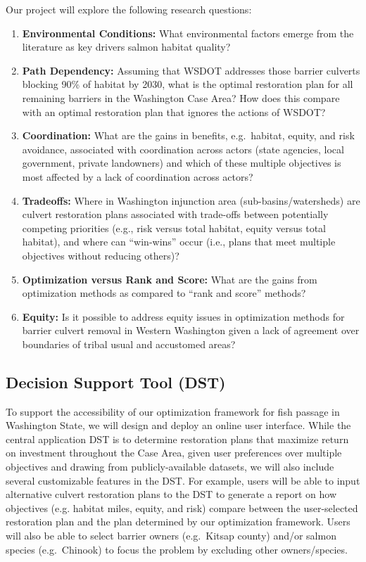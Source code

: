 Our project will explore the following research questions:

\begin{enumerate}
\item \textbf{Environmental Conditions:} What environmental factors emerge from the literature as key drivers salmon habitat quality?
\item \textbf{Path Dependency:} Assuming that WSDOT addresses those barrier culverts blocking 90\% of habitat by 2030, what is the optimal restoration plan for all remaining barriers in the Washington Case Area? How does this compare with an optimal restoration plan that ignores the actions of WSDOT?
\item \textbf{Coordination:} What are the gains in benefits, e.g.\ habitat, equity, and risk avoidance, associated with coordination across actors (state agencies, local government, private landowners) and which of these multiple objectives is most affected by a lack of coordination across actors? 
\item \textbf{Tradeoffs:} Where in Washington injunction area (sub-basins/watersheds) are culvert restoration plans associated with trade-offs between potentially competing priorities (e.g., risk versus total habitat, equity versus total habitat), and where can ``win-wins'' occur (i.e., plans that meet multiple objectives without reducing others)? 
\item \textbf{Optimization versus Rank and Score:} What are the gains from optimization methods as compared to ``rank and score'' methods?
\item \textbf{Equity:} Is it possible to address equity issues in optimization methods for barrier culvert removal in Western Washington given a lack of agreement over boundaries of tribal usual and accustomed areas?
\end{enumerate}

\subsection*{Decision Support Tool (DST)}

To support the accessibility of our optimization framework for fish passage in Washington State, we will design and deploy an online user interface. While the central application DST is to determine restoration plans that maximize return on investment throughout the Case Area, given user preferences over multiple objectives and drawing from publicly-available datasets, we will also include several customizable features in the DST. For example, users will be able to input alternative culvert restoration plans to the DST to generate a report on how objectives (e.g. habitat miles, equity, and risk) compare between the user-selected restoration plan and the plan determined by our optimization framework. Users will also be able to select barrier owners (e.g.\ Kitsap county) and/or salmon species (e.g.\ Chinook) to focus the problem by excluding other owners/species. 

